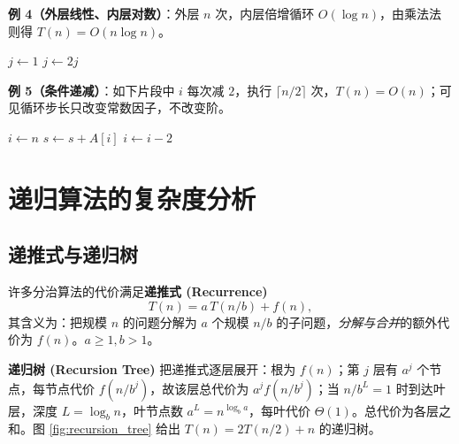 \textbf{例 4（外层线性、内层对数）}：外层 $n$ 次，内层倍增循环 $O(\log n)$，由乘法法则得 $T(n)=O(n\log n)$。

\begin{algorithm}[H]
\caption{线性外层嵌套对数内层}
\begin{algorithmic}[1]
    \State $j \gets 1$
        \State $j \gets 2j$
    \EndWhile
\EndFor
\end{algorithmic}
\end{algorithm}

\textbf{例 5（条件递减）}：如下片段中 $i$ 每次减 $2$，执行 $\lceil n/2 \rceil$ 次，$T(n)=O(n)$；可见循环步长只改变常数因子，不改变阶。

\begin{algorithm}[H]
\caption{步长非一的线性循环}
\begin{algorithmic}[1]
\State $i \gets n$
    \State $s \gets s + A[i]$
    \State $i \gets i - 2$
\EndWhile
\end{algorithmic}
\end{algorithm}

\section{递归算法的复杂度分析}
\label{sec:recurrence}

\subsection{递推式与递归树}

许多分治算法的代价满足\textbf{递推式 (Recurrence)}
\begin{equation}
T(n)=a\,T(n/b)+f(n),
\end{equation}
其含义为：把规模 $n$ 的问题分解为 $a$ 个规模 $n/b$ 的子问题，\emph{分解与合并}的额外代价为 $f(n)$。$a\ge 1,b>1$。

\textbf{递归树 (Recursion Tree)} 把递推式逐层展开：根为 $f(n)$；第 $j$ 层有 $a^j$ 个节点，每节点代价 $f(n/b^j)$，故该层总代价为 $a^j f(n/b^j)$；当 $n/b^L=1$ 时到达叶层，深度 $L=\log_b n$，叶节点数 $a^{L}=n^{\log_b a}$，每叶代价 $\Theta(1)$。总代价为各层之和。图 \ref{fig:recursion_tree} 给出 $T(n)=2T(n/2)+n$ 的递归树。


